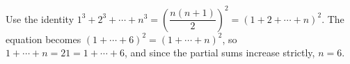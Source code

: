 Use the identity \(1^3+2^3+\cdots+n^3=\left(\dfrac{n(n+1)}{2}\right)^2=(1+2+\cdots+n)^2\). The equation becomes \((1+\cdots+6)^2=(1+\cdots+n)^2\), so \(1+\cdots+n=21=1+\cdots+6\), and since the partial sums increase strictly, \(n=\boxed{6}\).
